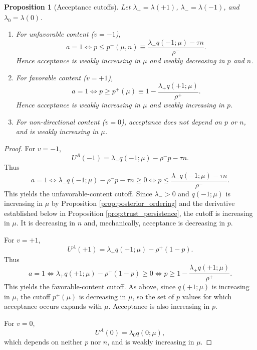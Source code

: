 \documentclass[12pt,american]{article}
\newtheorem{proposition}{Proposition}
\begin{document}
\begin{refsection}
		\begin{proposition}[Acceptance cutoffs]
			\label{prop:acceptance_cutoffs}
			Let \(\lambda_+=\lambda(+1)\), \(\lambda_-=\lambda(-1)\), and \(\lambda_0=\lambda(0)\).
			
			\begin{enumerate}
				\item For unfavorable content (\(v=-1\)),
				\[
				a=1
				\iff
				p\le p^-(\mu,n)
				\equiv
				\frac{\lambda_- q(-1;\mu)-\tau n}{\rho^-}.
				\]
				Hence acceptance is weakly increasing in \(\mu\) and weakly decreasing in \(p\) and \(n\).
				
				\item For favorable content (\(v=+1\)),
				\[
				a=1
				\iff
				p\ge p^+(\mu)
				\equiv
				1-\frac{\lambda_+ q(+1;\mu)}{\rho^+}.
				\]
				Hence acceptance is weakly increasing in \(\mu\) and weakly increasing in \(p\).
				
				\item For non-directional content (\(v=0\)), acceptance does not depend on \(p\) or \(n\), and is weakly increasing in \(\mu\).
			\end{enumerate}
		\end{proposition}
		
		\begin{proof}
			For \(v=-1\),
			\[
			U^A(-1)=\lambda_- q(-1;\mu)-\rho^- p-\tau n.
			\]
			Thus
			\[
			a=1
			\iff
			\lambda_- q(-1;\mu)-\rho^- p-\tau n\ge 0
			\iff
			p\le \frac{\lambda_- q(-1;\mu)-\tau n}{\rho^-}.
			\]
				This yields the unfavorable-content cutoff. Since \(\lambda_->0\) and \(q(-1;\mu)\) is increasing in \(\mu\) by Proposition \ref{prop:posterior_ordering} and the derivative established below in Proposition \ref{prop:trust_persistence}, the cutoff is increasing in \(\mu\). It is decreasing in \(n\) and, mechanically, acceptance is decreasing in \(p\).
			
			For \(v=+1\),
			\[
			U^A(+1)=\lambda_+ q(+1;\mu)-\rho^+(1-p).
			\]
			Thus
			\[
			a=1
			\iff
			\lambda_+ q(+1;\mu)-\rho^+(1-p)\ge 0
			\iff
			p\ge 1-\frac{\lambda_+ q(+1;\mu)}{\rho^+}.
			\]
				This yields the favorable-content cutoff. As above, since \(q(+1;\mu)\) is increasing in \(\mu\), the cutoff \(p^+(\mu)\) is decreasing in \(\mu\), so the set of \(p\) values for which acceptance occurs expands with \(\mu\). Acceptance is also increasing in \(p\).
			
			For \(v=0\),
			\[
			U^A(0)=\lambda_0 q(0;\mu),
			\]
			which depends on neither \(p\) nor \(n\), and is weakly increasing in \(\mu\).
		\end{proof}
		

\end{refsection}
\end{document}
